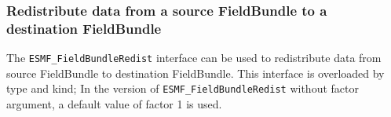  
\setlength{\oldparskip}{\parskip}
\setlength{\parskip}{1.5ex}
\setlength{\oldparindent}{\parindent}
\setlength{\parindent}{0pt}
\setlength{\oldbaselineskip}{\baselineskip}
\setlength{\baselineskip}{11pt}
 
\def\bv{\begin{verbatim}}
\def\ev{\end{verbatim}}
\def\be{\begin{equation}}
\def\ee{\end{equation}}
\def\bea{\begin{eqnarray}}
\def\eea{\end{eqnarray}}
\def\bi{\begin{itemize}}
\def\ei{\end{itemize}}
\def\bn{\begin{enumerate}}
\def\en{\end{enumerate}}
\def\bd{\begin{description}}
\def\ed{\end{description}}
\def\({\left (}
\def\){\right )}
\def\[{\left [}
\def\]{\right ]}
\def\<{\left  \langle}
\def\>{\right \rangle}
\def\cI{{\cal I}}
\def\diag{\mathop{\rm diag}}
\def\tr{\mathop{\rm tr}}


 

   \subsubsection{Redistribute data from a source FieldBundle to a destination FieldBundle}
   \label{sec:fieldbundle:usage:redist_1dptr}
  
   The {\tt ESMF\_FieldBundleRedist} interface can be used to redistribute data from
   source FieldBundle to destination FieldBundle. This interface is overloaded by type and kind;
   In the version of {\tt ESMF\_FieldBundleRedist} without factor argument, a default value
   of factor 1 is used.
   
